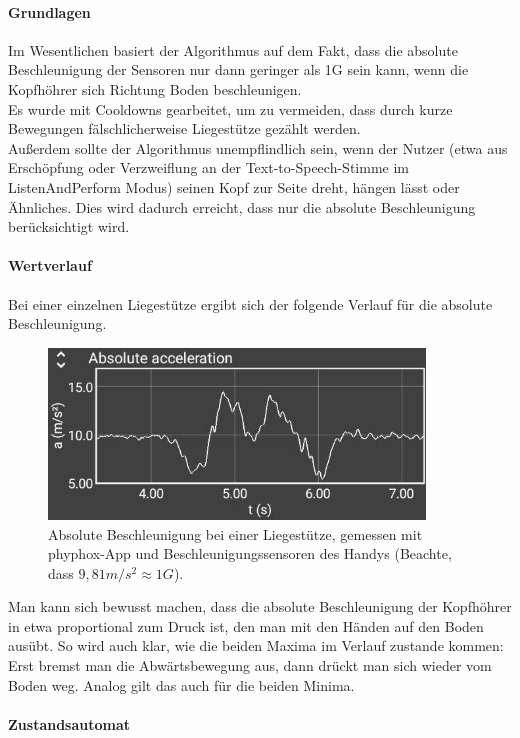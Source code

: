 \documentclass[a4paper,12pt]{article}
\begin{document}
\paragraph{Grundlagen}
Im Wesentlichen basiert der Algorithmus auf dem Fakt, dass die absolute Beschleunigung der Sensoren nur dann geringer als 1G sein kann, wenn die Kopfhöhrer sich Richtung Boden beschleunigen.\\
Es wurde mit Cooldowns gearbeitet, um zu vermeiden, dass durch kurze Bewegungen fälschlicherweise Liegestütze gezählt werden.\\
Außerdem sollte der Algorithmus unempflindlich sein, wenn der Nutzer (etwa aus Erschöpfung oder Verzweiflung an der Text-to-Speech-Stimme im ListenAndPerform Modus) seinen Kopf zur Seite dreht, hängen lässt oder Ähnliches. Dies wird dadurch erreicht, dass nur die absolute Beschleunigung berücksichtigt wird.
\paragraph{Wertverlauf}
Bei einer einzelnen Liegestütze ergibt sich der folgende Verlauf für die absolute Beschleunigung.\\
\begin{figure}[ht]
	\centering
\includegraphics[width = 10cm]{bilder/pushup_sample.jpg}
	\caption{Absolute Beschleunigung bei einer Liegestütze, gemessen mit phyphox-App und Beschleunigungssensoren des Handys (Beachte, dass $9,81 m/s^2 \approx 1 G$).}
\end{figure} 
Man kann sich bewusst machen, dass die absolute Beschleunigung der Kopfhöhrer in etwa proportional zum Druck ist, den man mit den Händen auf den Boden ausübt. So wird auch klar, wie die beiden Maxima im Verlauf zustande kommen: Erst bremst man die Abwärtsbewegung aus, dann drückt man sich wieder vom Boden weg. Analog gilt das auch für die beiden Minima. 
\paragraph{Zustandsautomat}

\end{document}
